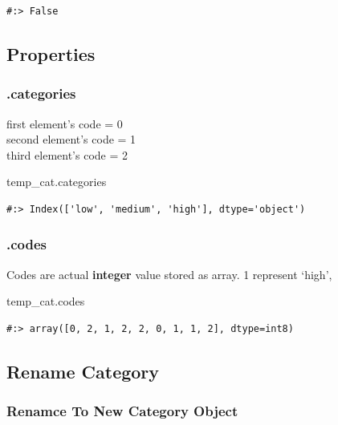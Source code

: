 \documentclass[
]{book}
\newenvironment{Shaded}{\begin{snugshade}}{\end{snugshade}}
\newcommand{\NormalTok}[1]{#1}
\begin{document}
\begin{verbatim}
#:> False
\end{verbatim}

\hypertarget{properties}{%
\subsection{Properties}\label{properties}}

\hypertarget{categories}{%
\subsubsection{.categories}\label{categories}}

first element's code = 0\\
second element's code = 1\\
third element's code = 2

\begin{Shaded}
\begin{Highlighting}[]
\NormalTok{temp_cat.categories}
\end{Highlighting}
\end{Shaded}

\begin{verbatim}
#:> Index(['low', 'medium', 'high'], dtype='object')
\end{verbatim}

\hypertarget{codes}{%
\subsubsection{.codes}\label{codes}}

Codes are actual \textbf{integer} value stored as array. 1 represent `high',

\begin{Shaded}
\begin{Highlighting}[]
\NormalTok{temp_cat.codes}
\end{Highlighting}
\end{Shaded}

\begin{verbatim}
#:> array([0, 2, 1, 2, 2, 0, 1, 1, 2], dtype=int8)
\end{verbatim}

\hypertarget{rename-category}{%
\subsection{Rename Category}\label{rename-category}}

\hypertarget{renamce-to-new-category-object}{%
\subsubsection{Renamce To New Category Object}\label{renamce-to-new-category-object}}
\end{document}

